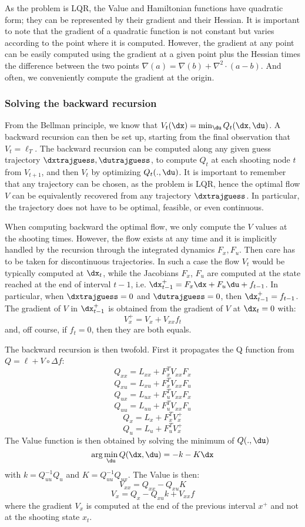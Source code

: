 \documentclass[10pt,a4paper]{article}
\begin{document}
As the problem is LQR, the Value and Hamiltonian functions have quadratic form; they can be represented by their gradient and their Hessian.
It is important to note that the gradient of a quadratic function is not constant but varies according to the point where it is computed. However, the gradient at any point can be easily computed using the gradient at a given point plus the Hessian times the difference between the two points $\nabla (a) = \nabla(b) + \nabla^2\cdot(a-b)$. And often, we conveniently compute the gradient at the origin.

\subsubsection{Solving the backward recursion}
From the Bellman principle, we know that $V_t(\dx) = \min_{\du} Q_t(\dx,\du)$.
A backward recursion can then be set up, starting from the final observation that $V_t = \ell_T$.
The backward recursion can be computed along any given guess trajectory $\dxtrajguess, \dutrajguess$, to compute $Q_t$ at each shooting node $t$ from $V_{t+1}$, and then $V_t$ by optimizing $Q_t(.,\du)$.
It is important to remember that any trajectory can be chosen, as the problem is LQR, hence the optimal flow $V$ can  be equivalently recovered from any trajectory $\dxtrajguess$.
In particular, the trajectory does not have to be optimal, feasible, or even continuous.

When computing backward the optimal flow, we only compute the $V$ values at the shooting times.
However, the flow exists at any time and it is implicitly handled by the recursion through the integrated dynamics $F_x,F_u$.
Then care has to be taken for discontinuous trajectories.
In such a case the flow $V_t$ would be typically computed at $\dx_t$, while the Jacobians $F_x$, $F_u$ are computed at the state reached at the end of interval $t-1$, i.e. $\dx_{t-1}^+ = F_x \dx + F_u \du + f_{t-1}$.
In particular, when $\dxtrajguess =0$ and $\dutrajguess=0$, then $\dx_{t-1}^+ = f_{t-1}$.
The gradient of $V$ in $\dx_{t-1}^+$ is obtained from the gradient of $V$ at $\dx_t=0$ with:
$$V_x^+ = V_x + V_{xx} f_t$$
and, off course, if $f_t=0$, then they are both equals.

The backward recursion is then twofold. First it propagates the Q function from $Q=\ell+V\circ \Delta f$:
$$Q_{xx} = L_{xx} + F_x^T V_{xx} F_x$$
$$Q_{xu} = L_{xu} + F_x^T V_{xx} F_u$$
$$Q_{ux} = L_{ux} + F_u^T V_{xx} F_x$$
$$Q_{uu} = L_{uu} + F_u^T V_{xx} F_u$$
$$Q_{x}  = L_x + F_x^T V_x^+$$
$$Q_{u}  = L_u + F_u^T V_x^+$$
The Value function is then obtained by solving the minimum of $Q(.,\du)$
$$\text{arg}\min_{\du} Q(\dx,\du) = -k - K \dx$$
with $k=Q_{uu}^{-1} Q_u$ and $K = Q_{uu}^{-1} Q_{ux}$. The Value is then:
$$V_{xx} = Q_{xx} - Q_{xu} K$$
$$V_x = Q_x - Q_{xu} k + V_{xx} f$$
where the gradient $V_x$ is computed at the end of the previous interval $x^+$ and not at the shooting state $x_t$.
\end{document}
